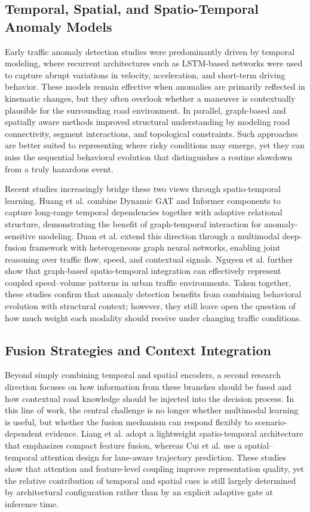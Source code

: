 \documentclass[journal]{IEEEtran}
\begin{document}
\subsection{Temporal, Spatial, and Spatio-Temporal Anomaly Models}
Early traffic anomaly detection studies were predominantly driven by temporal modeling, where recurrent architectures such as LSTM-based networks were used to capture abrupt variations in velocity, acceleration, and short-term driving behavior. These models remain effective when anomalies are primarily reflected in kinematic changes, but they often overlook whether a maneuver is contextually plausible for the surrounding road environment. In parallel, graph-based and spatially aware methods improved structural understanding by modeling road connectivity, segment interactions, and topological constraints. Such approaches are better suited to representing where risky conditions may emerge, yet they can miss the sequential behavioral evolution that distinguishes a routine slowdown from a truly hazardous event.

Recent studies increasingly bridge these two views through spatio-temporal learning. Huang et al. \cite{huang_multivariate_2024} combine Dynamic GAT and Informer components to capture long-range temporal dependencies together with adaptive relational structure, demonstrating the benefit of graph-temporal interaction for anomaly-sensitive modeling. Duan et al. \cite{sun_framework_2025} extend this direction through a multimodal deep-fusion framework with heterogeneous graph neural networks, enabling joint reasoning over traffic flow, speed, and contextual signals. Nguyen et al. \cite{nguyen_spatiotemporal_2026} further show that graph-based spatio-temporal integration can effectively represent coupled speed--volume patterns in urban traffic environments. Taken together, these studies confirm that anomaly detection benefits from combining behavioral evolution with structural context; however, they still leave open the question of how much weight each modality should receive under changing traffic conditions.

\subsection{Fusion Strategies and Context Integration}
Beyond simply combining temporal and spatial encoders, a second research direction focuses on how information from these branches should be fused and how contextual road knowledge should be injected into the decision process. In this line of work, the central challenge is no longer whether multimodal learning is useful, but whether the fusion mechanism can respond flexibly to scenario-dependent evidence. Liang et al. \cite{liang_anomaly_2025} adopt a lightweight spatio-temporal architecture that emphasizes compact feature fusion, whereas Cui et al. \cite{cui_lane-flow-learning_2026} use a spatial--temporal attention design for lane-aware trajectory prediction. These studies show that attention and feature-level coupling improve representation quality, yet the relative contribution of temporal and spatial cues is still largely determined by architectural configuration rather than by an explicit adaptive gate at inference time.
\end{document}

